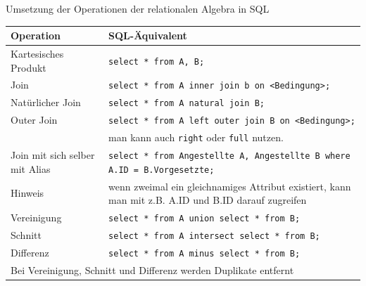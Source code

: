 \documentclass{article}
\begin{document}
\begin{block}{Umsetzung der Operationen der relationalen Algebra in SQL}
  \begin{center}
    \begin{tabular}{|p{4cm}|p{7cm}|}
      \hline
      \textbf{Operation} & \textbf{SQL-Äquivalent} \\
      \hline
      Kartesisches Produkt & \texttt{select * from A, B;} \\
      \hline
      Join & \texttt{select * from A inner join b on <Bedingung>;} \\
      \hline
      Natürlicher Join & \texttt{select * from A natural join B;} \\
      \hline
      Outer Join & \texttt{select * from A left outer join B on <Bedingung>;} \\
      & man kann auch \texttt{right} oder \texttt{full} nutzen. \\
      \hline
      Join mit sich selber mit Alias & \texttt{select * from Angestellte A, Angestellte B where A.ID = B.Vorgesetzte;} \\
      \hline
      Hinweis & wenn zweimal ein gleichnamiges Attribut existiert, kann man mit z.B. A.ID und B.ID darauf zugreifen \\
      \hline
      Vereinigung & \texttt{select * from A union select * from B;} \\
      \hline
      Schnitt & \texttt{select * from A intersect select * from B;} \\
      \hline
      Differenz & \texttt{select * from A minus select * from B;} \\
      \hline
      \multicolumn{2}{|p{11cm}|}{Bei Vereinigung, Schnitt und Differenz werden Duplikate entfernt} \\
      \hline
    \end{tabular}
  \end{center}
\end{block}
\end{document}
